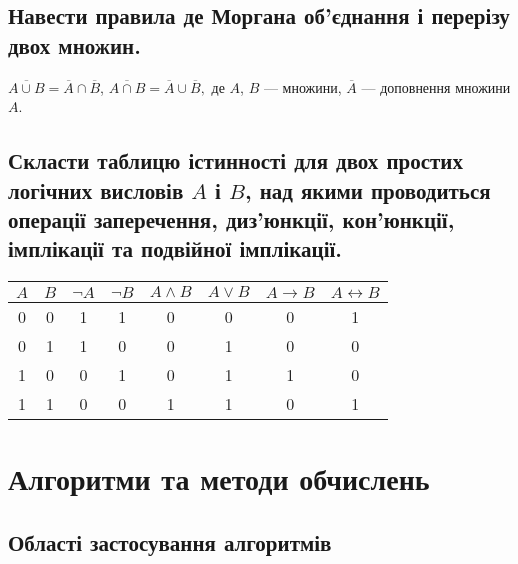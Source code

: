 \documentclass[a4paper,oneside,DIV=12,fontsize=12pt, headings=small]{scrartcl}
\begin{document}
		\subsection{Навести правила де Моргана об’єднання і перерізу двох множин.}
			$\overline{A \cup B} = \overline{A} \cap \overline{B}$, $\overline{A \cap B} = \overline{A} \cup \overline{B},$ де $A$, $B$ --- множини, $\overline{A}$ --- доповнення множини $A$.
		
		\subsection{Скласти таблицю істинності для двох простих логічних висловів $A$ і $B$, над якими проводиться операції заперечення, диз'юнкції, кон'юнкції, імплікації та подвійної імплікації.}
			\begin{table}[h!]
				\centering
				
				\begin{tabular}{cccccccc}
					\toprule
					$A$ & $B$ & $\lnot A$ & $\lnot B$ & $A \land B$ & $A \lor B$ & $A \rightarrow B$ & $A \leftrightarrow B$ \\
					\midrule
					 0  & 0   & 1         & 1         & 0           & 0          & 0                 & 1\\
					 0  & 1   & 1         & 0         & 0           & 1          & 0                 & 0\\
					 1  & 0   & 0         & 1         & 0           & 1          & 1                 & 0\\
					 1  & 1   & 0         & 0         & 1           & 1          & 0                 & 1 \\	
					\bottomrule
				\end{tabular}
			\end{table}
		
	\section{Алгоритми та методи обчислень}
		\subsection{Області застосування алгоритмів}
		
\end{document}
